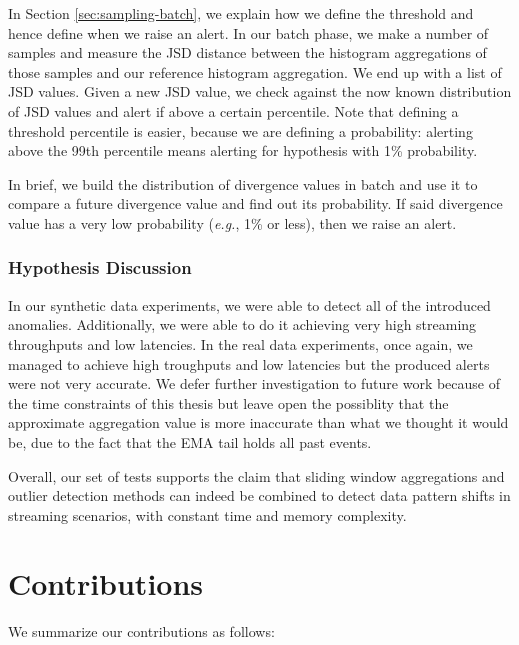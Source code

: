In Section \ref{sec:sampling-batch}, we explain how we define the threshold and hence define when we raise an alert. In our batch phase, we make a number of samples and measure the JSD distance between the histogram aggregations of those samples and our reference histogram aggregation. We end up with a list of JSD values. Given a new JSD value, we check against the now known distribution of JSD values and alert if above a certain percentile. Note that defining a threshold percentile is easier, because we are defining a probability: alerting above the 99th percentile means alerting for hypothesis with 1\% probability.

In brief, we build the distribution of divergence values in batch and use it to compare a future divergence value and find out its probability. If said divergence value has a very low probability (\textit{e.g.}, 1\% or less), then we raise an alert.

\subsubsection*{Hypothesis Discussion}
In our synthetic data experiments, we were able to detect all of the introduced anomalies. Additionally, we were able to do it achieving very high streaming throughputs and low latencies. In the real data experiments, once again, we managed to achieve high troughputs and low latencies but the produced alerts were not very accurate. We defer further investigation to future work because of the time constraints of this thesis but leave open the possiblity that the approximate aggregation value is more inaccurate than what we thought it would be, due to the fact that the EMA tail holds all past events.

Overall, our set of tests supports the claim that sliding window aggregations and outlier detection methods can indeed be combined to detect data pattern shifts in streaming scenarios, with constant time and memory complexity.

\section{Contributions}
We summarize our contributions as follows:

